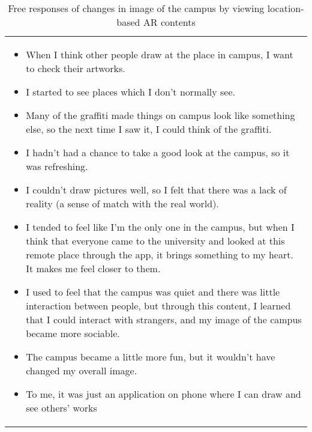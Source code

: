 \begin{table}[h]
\begin{center}
    \caption{Free responses of changes in image of the campus by viewing location-based AR contents}\label{table:11}
    \begin{tabular}{L{\textwidth}}
        \hline
           \\
        \hline
          {
            \begin{itemize}
              \item When I think other people draw at the place in campus, I want to check their artworks.
              \item I started to see places which I don't normally see.
              \item Many of the graffiti made things on campus look like something else, so the next time I saw it, I could think of the graffiti.
              \item I hadn't had a chance to take a good look at the campus, so it was refreshing.
              \item I couldn't draw pictures well, so I felt that there was a lack of reality (a sense of match with the real world).
              \item I tended to feel like I'm the only one in the campus, but when I think that everyone came to the university and looked at this remote place through the app, it brings something to my heart. It makes me feel closer to them.
              \item I used to feel that the campus was quiet and there was little interaction between people, but through this content, I learned that I could interact with strangers, and my image of the campus became more sociable.
              \item The campus became a little more fun, but it wouldn't have changed my overall image.
              \item To me, it was just an application on phone where I can draw and see others' works
            \end{itemize}
          } \\
        \hline
    \end{tabular}
\end{center} 
\end{table}

